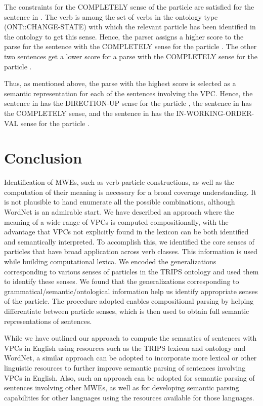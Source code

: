 \documentclass[output=paper,modfonts,nonflat]{langsci/langscibook}
\begin{document}
The constraints for the COMPLETELY sense of the particle  are satisfied for the sentence in . The verb  is among the set of verbs in the ontology type (ONT::CHANGE-STATE) with which the relevant particle has been identified in the ontology to get this sense. Hence, the parser assigns a higher score to the parse for the sentence with the COMPLETELY sense for the particle . The other two sentences get a lower score for a parse with the COMPLETELY sense for the particle .

Thus, as mentioned above, the parse with the highest score is selected as a semantic representation for each of the sentences involving the VPC. Hence, the sentence in  has the DIRECTION-UP sense for the particle , the sentence in  has the COMPLETELY sense, and the sentence in  has the IN-WORKING-ORDER-VAL sense for the particle .

\section{Conclusion } \label{bha:sec:conclusions}
Identification of MWEs, such as verb-particle constructions, as well as the computation of their meaning is necessary for a broad coverage understanding. It is not plausible to hand enumerate all the possible combinations, although WordNet is an admirable start.  We have described an approach where the meaning of a wide range of VPCs is computed compositionally, with the advantage that VPCs not explicitly found in the lexicon can be both identified and semantically interpreted. To accomplish this, we identified the core senses of particles that have broad application across verb classes. This information is used while building computational lexica. We encoded the generalizations corresponding to various senses of particles in the TRIPS ontology and used them to identify these senses. We found that the generalizations corresponding to grammatical/semantic/ontological information help us identify appropriate senses of the particle. The procedure adopted enables compositional parsing by helping differentiate between particle senses, which is then used to obtain full semantic representations of sentences.

While we have outlined our approach to compute the semantics of sentences with VPCs in English using resources such as the TRIPS lexicon and ontology and WordNet, a similar approach can be adopted to incorporate more lexical or other linguistic resources to further improve semantic parsing of sentences involving VPCs in English. Also, such an approach can be adopted for semantic parsing of sentences involving other MWEs, as well as for developing semantic parsing capabilities for other languages using the resources available for those languages.  
\end{document}
